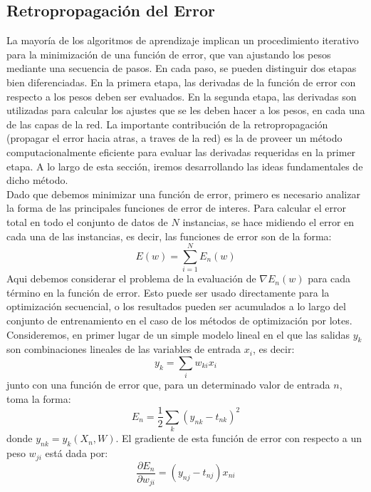 \documentclass[a4paper,11pt,spanish]{book}
\begin{document}
      \subsection{Retropropagación del Error}
	La mayoría de los algoritmos de aprendizaje implican un procedimiento iterativo para la minimización de una función de error, que van ajustando los pesos mediante 
	una secuencia de pasos. En cada paso, se pueden distinguir dos etapas bien diferenciadas. En la primera etapa, las derivadas de la función de error con 
	respecto a los pesos deben ser evaluados. En la segunda etapa, las derivadas son utilizadas para calcular los ajustes que se les deben hacer a los pesos, en cada una 
	de las capas de la red. La importante contribución de la retropropagación (propagar el error hacia atras, a traves de la red) es la de proveer un 
	método computacionalmente eficiente para evaluar las derivadas requeridas en la primer etapa. A lo largo de esta sección, iremos desarrollando las ideas fundamentales de dicho
	método.\\
	Dado que debemos minimizar una función de error, primero es necesario analizar la forma de las principales funciones de error de interes. 
	Para calcular el error total en todo el conjunto de datos de $N$ instancias, se hace midiendo el error en cada una de las instancias, es decir, las funciones de error 
	son de la forma:
	\begin{equation*}
	  E(w) = \sum_{i=1}^N E_n(w)
	\end{equation*}
	Aqui debemos considerar el problema de la evaluación de $\nabla E_n(w)$ para cada término en la función de error. Esto puede ser usado directamente para la optimización secuencial, 
	o los resultados pueden ser acumulados a lo largo  del conjunto de entrenamiento en el caso de los métodos de optimización por lotes.\\
	\iffalse
	Consideremos, en primer lugar de un simple modelo lineal en el que las salidas $y_k$ son combinaciones lineales de las variables de entrada $x_i$, es decir:
	\begin{equation*}
	  y_k = \sum_i w_{ki} x_i
	\end{equation*}
	junto con una función de error que, para un determinado valor de entrada $n$, toma la forma:
	\begin{equation*}
	  E_n = \frac{1}{2} \sum_k (y_{nk}-t_{nk})^2
	\end{equation*}
	donde $y_{nk} = y_{k} (X_n , W)$. El gradiente de esta función de error con respecto a un peso $w_{ji}$ está dada por:
	\begin{equation*}
	  \frac{\partial E_n}{\partial w_{ji}} = (y_{nj} − t_{nj}) x_{ni}
	\end{equation*}
\end{document}
